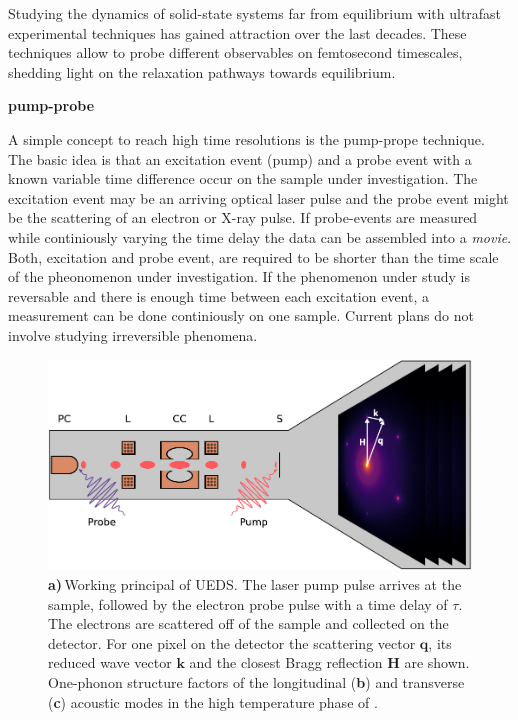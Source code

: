Studying the dynamics of solid-state systems far from equilibrium with ultrafast experimental techniques has gained attraction over the last decades.
These techniques allow to probe different observables on femtosecond timescales, shedding light on the relaxation pathways towards equilibrium.

\textbf{pump-probe}

A simple concept to reach high time resolutions is the pump-prope technique.
The basic idea is that an excitation event (pump) and a probe event with a known variable time difference occur on the sample under investigation.
The excitation event may be an arriving optical laser pulse and the probe event might be the scattering of an electron or X-ray pulse.
If probe-events are measured while continiously varying the time delay the data can be assembled into a \emph{movie}.
Both, excitation and probe event, are required to be shorter than the time scale of the pheonomenon under investigation.
If the phenomenon under study is reversable and there is enough time between each excitation event, a measurement can be done continiously on one sample.
Current plans do not involve studying irreversible phenomena.

\begin{figure}[!t]
	\includegraphics[width=\columnwidth]{figs/ued.pdf}
	\caption{\textbf{a)}\,Working principal of \acs{UEDS}. The laser pump pulse arrives at the sample, followed by the electron probe pulse with a time delay of $\tau$. The electrons are scattered off of the sample and collected on the detector. For one pixel on the detector the scattering vector $\mathbf{q}$, its reduced wave vector $\mathbf{k}$ and the closest Bragg reflection $\mathbf{H}$ are shown. One-phonon structure factors of the longitudinal (\textbf{b}) and transverse (\textbf{c}) acoustic modes in the high temperature phase of \ts.}
	\label{fig:ued}
\end{figure}

